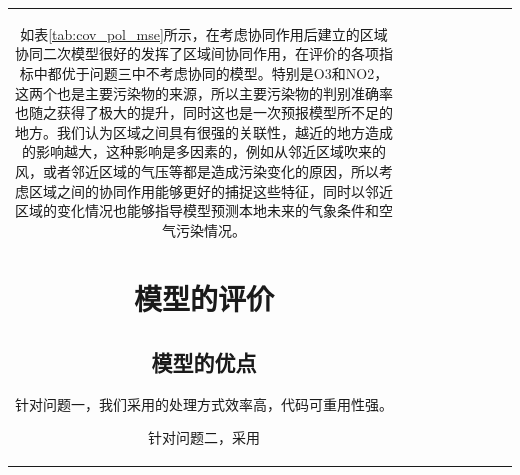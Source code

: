 \documentclass[bwprint]{gmcmthesis}
\numberwithin{figure}{section}
\begin{document}
\begin{table}
\begin{center}
{\begin{tabular}[ht]{|c|c|c|c|c|c|c|c|c|}
如表\ref{tab:cov_pol_mse}所示，在考虑协同作用后建立的区域协同二次模型很好的发挥了区域间协同作用，在评价的各项指标中都优于问题三中不考虑协同的模型。特别是O3和NO2，这两个也是主要污染物的来源，所以主要污染物的判别准确率也随之获得了极大的提升，同时这也是一次预报模型所不足的地方。我们认为区域之间具有很强的关联性，越近的地方造成的影响越大，这种影响是多因素的，例如从邻近区域吹来的风，或者邻近区域的气压等都是造成污染变化的原因，所以考虑区域之间的协同作用能够更好的捕捉这些特征，同时以邻近区域的变化情况也能够指导模型预测本地未来的气象条件和空气污染情况。

\section{模型的评价}
\subsection{模型的优点}

针对问题一，我们采用的处理方式效率高，代码可重用性强。

针对问题二，采用


\end{tabular}}
\end{center}
\end{table}
\end{document}
